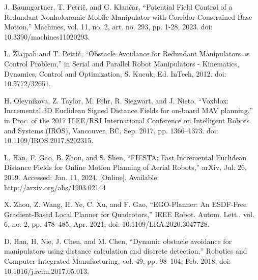 \documentclass[letterpaper, 10 pt, conference]{ieeeconf}  %
\begin{document}
\begin{thebibliography}{99}
J. Baumgartner, T. Petrič, and G. Klančar, “Potential Field Control of a Redundant Nonholonomic Mobile Manipulator with Corridor-Constrained Base Motion,” Machines, vol. 11, no. 2, art. no. 293, pp. 1-28, 2023. doi: 10.3390/machines11020293.

 L. Žlajpah and T. Petrič, “Obstacle Avoidance for Redundant Manipulators as Control Problem,” in Serial and Parallel Robot Manipulators - Kinematics, Dynamics, Control and Optimization, S. Kucuk, Ed. InTech, 2012. doi: 10.5772/32651.

 H. Oleynikova, Z. Taylor, M. Fehr, R. Siegwart, and J. Nieto, “Voxblox: Incremental 3D Euclidean Signed Distance Fields for on-board MAV planning,” in Proc. of the 2017 IEEE/RSJ International Conference on Intelligent Robots and Systems (IROS), Vancouver, BC, Sep. 2017, pp. 1366–1373. doi: 10.1109/IROS.2017.8202315.

 L. Han, F. Gao, B. Zhou, and S. Shen, “FIESTA: Fast Incremental Euclidean Distance Fields for Online Motion Planning of Aerial Robots,” arXiv, Jul. 26, 2019. Accessed: Jan. 11, 2024. [Online]. Available: http://arxiv.org/abs/1903.02144



 X. Zhou, Z. Wang, H. Ye, C. Xu, and F. Gao, “EGO-Planner: An ESDF-Free Gradient-Based Local Planner for Quadrotors,” IEEE Robot. Autom. Lett., vol. 6, no. 2, pp. 478–485, Apr. 2021, doi: 10.1109/LRA.2020.3047728.

 D. Han, H. Nie, J. Chen, and M. Chen, “Dynamic obstacle avoidance for manipulators using distance calculation and discrete detection,” Robotics and Computer-Integrated Manufacturing, vol. 49, pp. 98–104, Feb. 2018, doi: 10.1016/j.rcim.2017.05.013.



\end{thebibliography}
\end{document}
